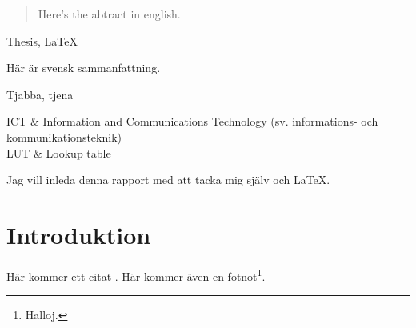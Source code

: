 \def \pdf {cover.pdf}					%
\def \authorname {Olle Calderon}		%




\postbegindocument


\begin{abstract}
Here's the abtract in english.
\end{abstract}

\begin{keywords}
Thesis, \LaTeX
\end{keywords}

\begin{sammanfattning}
Här är svensk sammanfattning.
\end{sammanfattning}

\begin{nyckelord}
Tjabba, tjena
\end{nyckelord}

\tableofcontents
\clearpage

\begin{definitioner}
ICT & Information and Communications Technology (sv. informations- och kommunikationsteknik)\\
LUT & Lookup table
\end{definitioner}

\begin{foerord}
Jag vill inleda denna rapport med att tacka mig själv och \LaTeX.
\end{foerord}

\section{Introduktion}
Här kommer ett citat \cite{exempelreferens}. Här kommer även en fotnot\footnote{Halloj.}.



